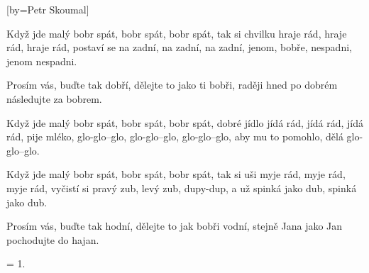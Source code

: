 [by={Petr Skoumal}]

\beginverse{}
Když jde malý bobr spát, bobr spát, bobr spát,
tak si chvilku hraje rád, hraje rád, hraje rád,
postaví se na zadní, na zadní, na zadní,
jenom, bobře, nespadni, jenom nespadni.
\endverse{}

\beginchorus{}
Prosím vás, buďte tak dobří, dělejte to jako ti bobři,
raději hned po dobrém následujte za bobrem.
\endchorus{}

\beginverse{}
Když jde malý bobr spát, bobr spát, bobr spát,
dobré jídlo jídá rád, jídá rád, jídá rád,
pije mléko, glo-glo--glo, glo-glo--glo, glo-glo--glo,
aby mu to pomohlo, dělá glo-glo--glo.
\endverse{}

\beginchorus{}

\endchorus{}

\beginverse{}
Když jde malý bobr spát, bobr spát, bobr spát,
tak si uši myje rád, myje rád, myje rád,
vyčistí si pravý zub, levý zub, dupy-dup,
a už spinká jako dub, spinká jako dub.
\endverse{}

\beginchorus{}
Prosím vás, buďte tak hodní, dělejte to jak bobři vodní,
stejně Jana jako Jan pochodujte do hajan.
\endchorus{}

\beginverse{}
= 1.
\endverse{}

\beginchorus{}

\endchorus{}

\endsong{}
